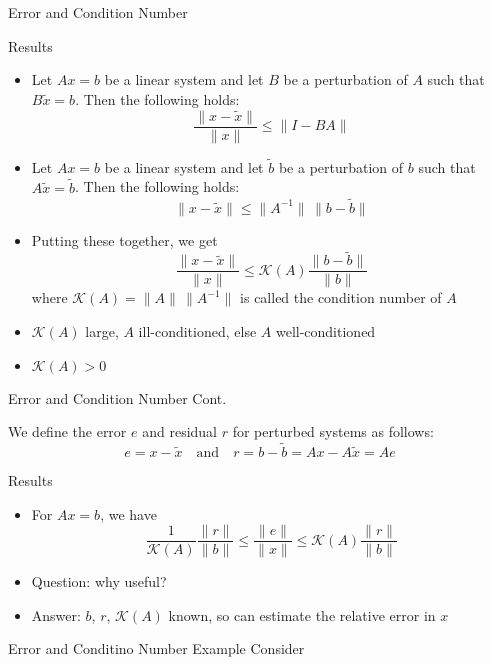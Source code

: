 \documentclass[9pt, serif]{beamer}
\newlength{\wideitemsep}
\let\olditem\item
\renewcommand{\item}{\setlength{\itemsep}{\wideitemsep}\olditem}
\newcommand{\bi}{\begin{itemize}}
\newcommand{\ei}{\end{itemize}}
\newcommand{\norm}[1]{\lVert#1\rVert}
\begin{document}
\begin{frame}{Error and Condition Number}
    \pause
    \begin{block}{Results}
        \bi
            \item Let $Ax = b$ be a linear system and let $B$ be a perturbation of
            $A$ such that $B\tilde{x} = b$. Then the following holds: $$\frac{\norm{x-\tilde{x}}}{\norm{x}} \le \norm{I-BA}$$ \pause
            \vspace{-5mm}
            \item Let $Ax = b$ be a linear system and let $\tilde{b}$ be a perturbation of
            $b$ such that $A\tilde{x} = \tilde{b}$. Then the following holds: $$\norm{x-\tilde{x}} \le \norm{A^{-1}}\,\norm{b-\tilde{b}}$$ \pause
            \vspace{-5mm}
            \item Putting these together, we get 
            $$\frac{\norm{x-\tilde{x}}}{\norm{x}} \le \mathcal{K}(A)\frac{\norm{b-\tilde{b}}}{\norm{b}}$$ where 
            $\mathcal{K}(A) = \norm{A}\,\norm{A^{-1}}$ is called the condition number of $A$ \pause
            \item $\mathcal{K}(A)$ large, $A$ ill-conditioned, else $A$ well-conditioned \pause
            \item $\mathcal{K}(A)>0$
        \ei
    \end{block}
\end{frame}


\begin{frame}{Error and Condition Number Cont.}
    \pause
    \begin{definition}
        We define the error $e$ and residual $r$ for perturbed systems as follows: 
        $$e = x - \tilde{x} \quad \text{and} \quad r = b - \tilde{b} = Ax - A\tilde{x} = Ae$$
    \end{definition} \pause
    \begin{block}{Results}
        \bi
            \item For $Ax = b$, we have 
            $$\frac{1}{\mathcal{K}(A)}\frac{\norm{r}}{\norm{b}} \le \frac{\norm{e}}{\norm{x}} \le \mathcal{K}(A)\frac{\norm{r}}{\norm{b}}$$
            \pause
            \item Question: why useful? \pause
            \item Answer: $b$, $r$, $\mathcal{K}(A)$ known, so can estimate the relative error in $x$
        \ei
    \end{block}
\end{frame}


\begin{frame}{Error and Conditino Number Example}
    Consider
\end{frame}
\end{document}
